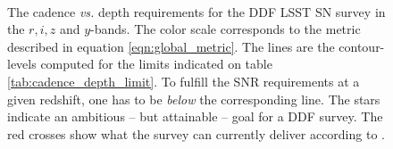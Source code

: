 \documentclass[\docopts]{\docclass}
\begin{document}
\begin{figure}
\begin{center}
\\
\caption{The cadence {\em vs.} depth requirements for the DDF LSST SN
  survey in the $r,i,z$ and $y$-bands. The color scale corresponds to
  the metric described in equation \ref{eqn:global_metric}.  The lines are
  the contour-levels computed for the limits indicated on table
  \ref{tab:cadence_depth_limit}. To fulfill the SNR requirements at a
  given redshift, one has to be {\em below} the corresponding
  line. The stars indicate an ambitious -- but attainable -- goal for
  a DDF survey.  The red crosses show what the survey can currently
  deliver according to . }
\label{fig:m5_cadence_limits_ddf}
\end{center}
\end{figure}
\end{document}
